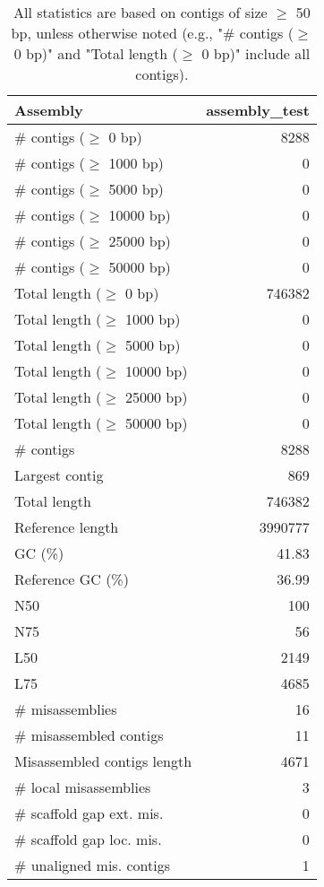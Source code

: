 \documentclass[12pt,a4paper]{article}
\begin{document}
\begin{table}[ht]
\begin{center}
\caption{All statistics are based on contigs of size $\geq$ 50 bp, unless otherwise noted (e.g., "\# contigs ($\geq$ 0 bp)" and "Total length ($\geq$ 0 bp)" include all contigs).}
\begin{tabular}{|l*{1}{|r}|}
\hline
Assembly & assembly\_test \\ \hline
\# contigs ($\geq$ 0 bp) & 8288 \\ \hline
\# contigs ($\geq$ 1000 bp) & 0 \\ \hline
\# contigs ($\geq$ 5000 bp) & 0 \\ \hline
\# contigs ($\geq$ 10000 bp) & 0 \\ \hline
\# contigs ($\geq$ 25000 bp) & 0 \\ \hline
\# contigs ($\geq$ 50000 bp) & 0 \\ \hline
Total length ($\geq$ 0 bp) & 746382 \\ \hline
Total length ($\geq$ 1000 bp) & 0 \\ \hline
Total length ($\geq$ 5000 bp) & 0 \\ \hline
Total length ($\geq$ 10000 bp) & 0 \\ \hline
Total length ($\geq$ 25000 bp) & 0 \\ \hline
Total length ($\geq$ 50000 bp) & 0 \\ \hline
\# contigs & 8288 \\ \hline
Largest contig & 869 \\ \hline
Total length & 746382 \\ \hline
Reference length & 3990777 \\ \hline
GC (\%) & 41.83 \\ \hline
Reference GC (\%) & 36.99 \\ \hline
N50 & 100 \\ \hline
N75 & 56 \\ \hline
L50 & 2149 \\ \hline
L75 & 4685 \\ \hline
\# misassemblies & 16 \\ \hline
\# misassembled contigs & 11 \\ \hline
Misassembled contigs length & 4671 \\ \hline
\# local misassemblies & 3 \\ \hline
\# scaffold gap ext. mis. & 0 \\ \hline
\# scaffold gap loc. mis. & 0 \\ \hline
\# unaligned mis. contigs & 1 \\ \hline

\end{tabular}
\end{center}
\end{table}
\end{document}
